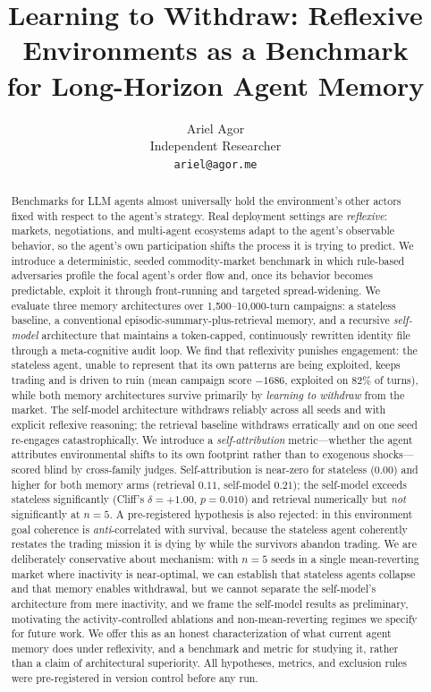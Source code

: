 \documentclass{article}
\title{Learning to Withdraw: Reflexive Environments as a Benchmark\\
for Long-Horizon Agent Memory}
\author{%
  Ariel Agor\\
  Independent Researcher\\
  \texttt{ariel@agor.me}\\
}
\begin{document}
\maketitle

\begin{abstract}
Benchmarks for LLM agents almost universally hold the environment's other actors fixed with respect to the agent's strategy. Real deployment settings are \emph{reflexive}: markets, negotiations, and multi-agent ecosystems adapt to the agent's observable behavior, so the agent's own participation shifts the process it is trying to predict. We introduce a deterministic, seeded commodity-market benchmark in which rule-based adversaries profile the focal agent's order flow and, once its behavior becomes predictable, exploit it through front-running and targeted spread-widening. We evaluate three memory architectures over 1{,}500--10{,}000-turn campaigns: a stateless baseline, a conventional episodic-summary-plus-retrieval memory, and a recursive \emph{self-model} architecture that maintains a token-capped, continuously rewritten identity file through a meta-cognitive audit loop. We find that reflexivity punishes engagement: the stateless agent, unable to represent that its own patterns are being exploited, keeps trading and is driven to ruin (mean campaign score $-1686$, exploited on 82\% of turns), while both memory architectures survive primarily by \emph{learning to withdraw} from the market. The self-model architecture withdraws reliably across all seeds and with explicit reflexive reasoning; the retrieval baseline withdraws erratically and on one seed re-engages catastrophically. We introduce a \emph{self-attribution} metric---whether the agent attributes environmental shifts to its own footprint rather than to exogenous shocks---scored blind by cross-family judges. Self-attribution is near-zero for stateless ($0.00$) and higher for both memory arms (retrieval $0.11$, self-model $0.21$); the self-model exceeds stateless significantly (Cliff's $\delta=+1.00$, $p=0.010$) and retrieval numerically but \emph{not} significantly at $n=5$. A pre-registered hypothesis is also rejected: in this environment goal coherence is \emph{anti}-correlated with survival, because the stateless agent coherently restates the trading mission it is dying by while the survivors abandon trading. We are deliberately conservative about mechanism: with $n=5$ seeds in a single mean-reverting market where inactivity is near-optimal, we can establish that stateless agents collapse and that memory enables withdrawal, but we cannot separate the self-model's architecture from mere inactivity, and we frame the self-model results as preliminary, motivating the activity-controlled ablations and non-mean-reverting regimes we specify for future work. We offer this as an honest characterization of what current agent memory does under reflexivity, and a benchmark and metric for studying it, rather than a claim of architectural superiority. All hypotheses, metrics, and exclusion rules were pre-registered in version control before any run.
\end{abstract}
\end{document}
